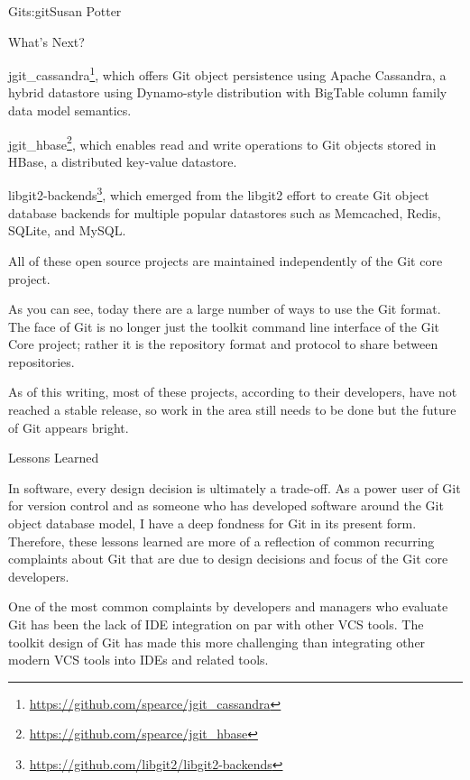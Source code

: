 \begin{aosachapter}{Git}{s:git}{Susan Potter}
\begin{aosasect1}{What's Next?}
 \begin{aosaitemize}
  \item jgit\_cassandra\footnote{\url{https://github.com/spearce/jgit_cassandra}},
    which offers Git object persistence using Apache Cassandra, a hybrid datastore
    using Dynamo-style distribution with BigTable column family data model
    semantics.
  \item jgit\_hbase\footnote{\url{https://github.com/spearce/jgit_hbase}},
    which enables read and write operations to Git objects stored in HBase, a
    distributed key-value datastore.
  \item libgit2-backends\footnote{\url{https://github.com/libgit2/libgit2-backends}},
    which emerged from the libgit2 effort to create Git object database
    backends for multiple popular datastores such as Memcached, Redis,
    SQLite, and MySQL.
\end{aosaitemize}

\noindent All of these open source projects are maintained independently of the Git
core project.

As you can see, today there are a large number of ways to use the Git format.
The face of Git is no longer just the toolkit command line interface of
the Git Core project; rather it is the repository format and protocol to
share between repositories.

As of this writing, most of these projects, according to their developers, have 
not reached a stable release, so work in the area still needs to be done
but the future of Git appears bright.

\end{aosasect1}

\begin{aosasect1}{Lessons Learned}

In software, every design decision is ultimately a trade-off. As a power
user of Git for version control and as someone who has developed software
around the Git object database model, I have a deep fondness for Git in its
present form. Therefore, these lessons learned are more of a reflection
of common recurring complaints about Git that are due to design decisions and
focus of the Git core developers.

One of the most common complaints by developers and managers who evaluate
Git has been the lack of IDE
integration on par with other VCS tools. The toolkit design of Git has made
this more challenging than integrating other modern VCS tools into IDEs
and related tools.


\end{aosasect1}
\end{aosachapter}
